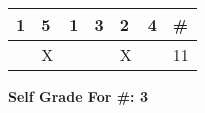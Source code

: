 \documentclass[conference]{IEEEtran}
\begin{document}
\begin{itemize}
\begin{table}[H]
	\centering
	\begin{tabular}{|l|l|l|l|l|l|l|}
		\hline
		\textbf{1} & \textbf{5} & \textbf{1} & \textbf{3} & \textbf{2} & \textbf{4} & \textbf{\#} \\ \hline
		& X &  &  & X &  & 11 \\ \hline
	\end{tabular}
\end{table}

\begin{center}
	\textbf{Self Grade For \#: 3}
\end{center}
\end{itemize}

\end{document}
